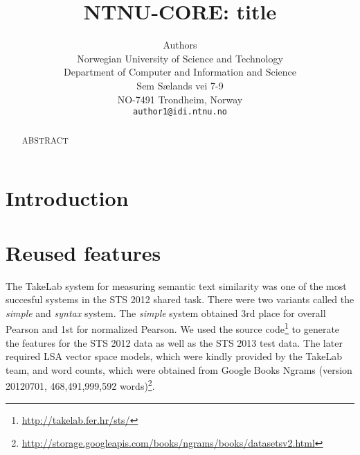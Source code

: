 \documentclass[11pt,letterpaper]{article}
\title{NTNU-CORE: title}
\author{Authors\\
  Norwegian University of Science and Technology\\
  Department of Computer and Information and Science\\
  Sem S{\ae}lands vei 7-9 \\
  NO-7491 Trondheim, Norway\\
  {\tt author1@idi.ntnu.no}}
\date{}
\begin{document}
\maketitle
\begin{abstract}
ABSTRACT
\end{abstract}

\section{Introduction}



\section{Reused features}

The TakeLab system for measuring semantic text similarity
\cite{vsaric2012takelab} was one of the most succesful systems in the
STS 2012 shared task. There were two variants called the \emph{simple}
and \emph{syntax} system. The \emph{simple} system obtained 3rd place
for overall Pearson and 1st for normalized Pearson. We used the source
code\footnote{\url{http://takelab.fer.hr/sts/}} to generate the
features for the STS 2012 data as well as the STS 2013 test data. The
later required LSA vector space models, which were kindly provided by
the TakeLab team, and word counts, which were obtained from Google
Books Ngrams (version 20120701, 468,491,999,592
words)\footnote{\url{http://storage.googleapis.com/books/ngrams/books/datasetsv2.html}}.
\end{document}
